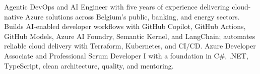 Agentic DevOps and AI Engineer with five years of experience delivering cloud-native Azure solutions across Belgium's public, banking, and energy sectors. Builds AI-enabled developer workflows with GitHub Copilot, GitHub Actions, GitHub Models, Azure AI Foundry, Semantic Kernel, and LangChain; automates reliable cloud delivery with Terraform, Kubernetes, and CI/CD. Azure Developer Associate and Professional Scrum Developer I with a foundation in C\#, .NET, TypeScript, clean architecture, quality, and mentoring.
